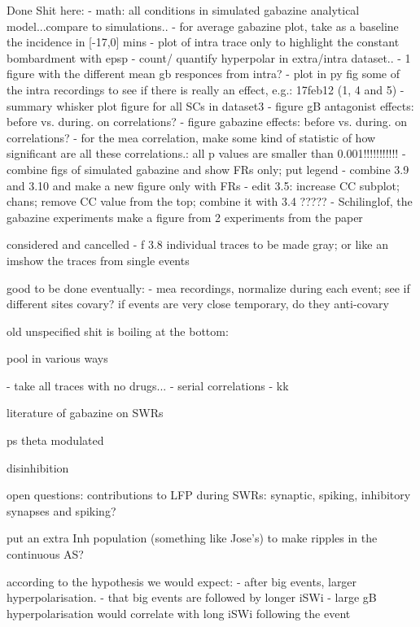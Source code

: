 Done Shit here:
- math: all conditions in simulated gabazine analytical model...compare to simulations..
- for average gabazine plot, take as a baseline the incidence in [-17,0] mins
- plot of intra trace only to highlight the constant bombardment with epsp 
- count/ quantify hyperpolar in extra/intra dataset..
- 1 figure with the different mean gb responces from intra?
- plot in py fig some of the intra recordings to see if there is really an effect, e.g.: 17feb12 (1, 4 and 5)
- summary whisker plot figure for all SCs in dataset3 
- figure gB antagonist effects: before vs. during. on correlations?
- figure gabazine effects: before vs. during. on correlations?
- for the mea correlation, make some kind of statistic of how significant are all these correlations.: all p values are smaller than 0.001!!!!!!!!!!!
- combine figs of simulated gabazine and show FRs only; put legend
- combine 3.9 and 3.10 and make a new figure only with FRs
- edit 3.5: increase CC subplot; chans; remove CC value from the top; combine it with 3.4 ?????
- Schilinglof, the gabazine experiments make a figure from 2 experiments from the paper

considered and cancelled
- f 3.8 individual traces to be made gray; or like an imshow the traces from single events

good to be done eventually:
- mea recordings, normalize during each event; see if different sites covary? if events are very close temporary, do they anti-covary


old unspecified shit is boiling at the bottom:


pool in various ways

  - take all traces with no drugs...
    - serial correlations
    - kk

literature of gabazine on SWRs


ps theta modulated

disinhibition

open questions:
contributions to LFP during SWRs: synaptic, spiking, inhibitory synapses and spiking?

put an extra Inh population (something like Jose's) to make ripples in the continuous AS?


  according to the hypothesis we would expect:
    - after big events, larger hyperpolarisation.
    - that big events are followed by longer iSWi
    - large gB hyperpolarisation would correlate with long iSWi following the event

